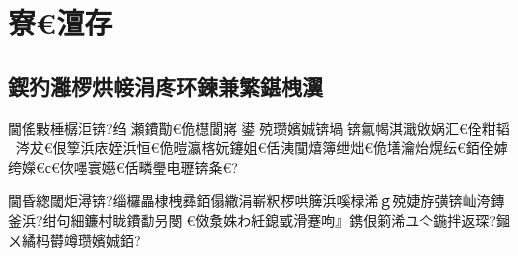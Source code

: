 ﻿\documentclass[lang=cn,11pt]{elegantbook}
\begin{document}
\section{寮€澶存}

\subsection{鍥犳灉椤烘帹涓庝环鍊兼繁鍖栧瀷}

閫傜敤棰樼洰锛?绉瀬鐨勩€佹櫘閬嶈鍙殑瓒嬪娍锛堝锛氱幆淇濈敓娲汇€佺粓韬涔犮€佷箰浜庡姪浜恒€佹暟瀛楁妧鑳姐€佸洟闃熺簿绁炪€佹墡瀹炲熀纭€銆佺嫭绔嬫€с€佽嚜寰嬨€佸疄璺电瓑锛夈€?

閫昏緫閾炬潯锛?缁欏畾棣栧彞銆傝繖涓嶄粎椤哄簲浜嗘椂浠ｇ殑婕斿彉锛屾洿鏄釜浜?绀句細鐮村眬鐨勫叧閿€傚洜姝わ紝鎴戜滑蹇呴』鎸佷箣浠ユ亽鍦拌返琛?鎺ㄨ繘杩欎竴瓒嬪娍銆?
\end{document}
